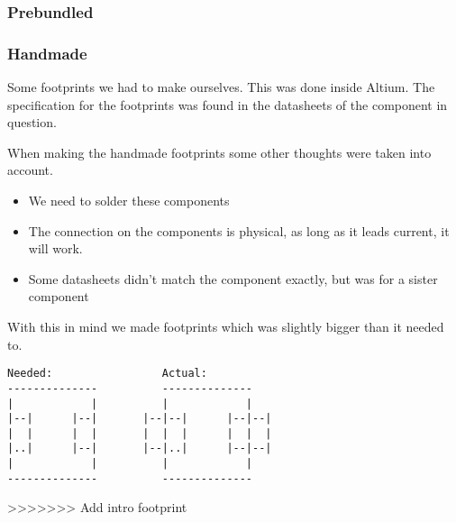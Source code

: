 


\subsubsection{Prebundled}

\subsubsection{Handmade}
Some footprints we had to make ourselves.
This was done inside Altium.
The specification for the footprints was found in the datasheets of the component in question.

When making the handmade footprints some other thoughts were taken into account.

\begin{itemize}
    \item We need to solder these components
    \item The connection on the components is physical, as long as it leads current, it will work.
    \item Some datasheets didn't match the component exactly, but was for a sister component
\end{itemize}

With this in mind we made footprints which was slightly bigger than it needed to.

\begin{verbatim}
Needed:                 Actual:
--------------          --------------
|            |          |            |
|--|      |--|       |--|--|      |--|--|
|  |      |  |       |  |  |      |  |  |
|..|      |--|       |--|..|      |--|--|
|            |          |            |
--------------          --------------
\end{verbatim}
>>>>>>> Add intro footprint
